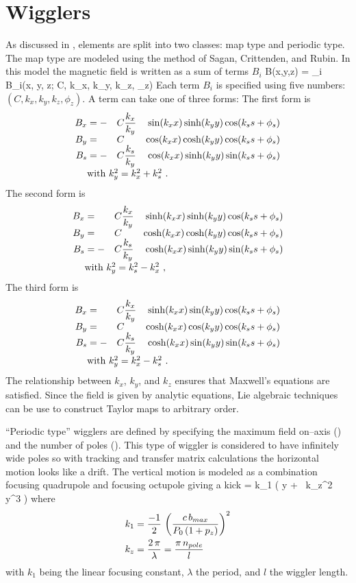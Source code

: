 \section{Wigglers}
\label{s:wiggler_phys}

As discussed in , \bmad {} elements are
split into two classes: map type and periodic type. The map type
 are modeled using the method of Sagan, Crittenden, and
Rubin\cite{b:wiggler}. In this model the magnetic field is written as
a sum of terms $B_i$
\Begineq
  B(x,y,z) = \sum_i B_i(x, y, z; C, k_x, k_y, k_z, \phi_z)
\Endeq 
Each term $B_i$ is specified using five numbers: 
$(C, k_x, k_y, k_z, \phi_z)$. A term can take one of three forms: The first
form is
\begin{alignat}{4}
  B_x &= -&C &\dfrac{k_x}{k_y} & \sin(\kxx) \sinh(\kyy) \cos(\ksss) \CRNEG
  B_y &=  &C &                 & \cos(\kxx) \cosh(\kyy) \cos(\ksss) \CRNEG
  B_s &= -&C &\dfrac{k_s}{k_y} & \cos(\kxx) \sinh(\kyy) \sin(\ksss) \CRneg
  & \makebox[1pt][l]{with $k_y^2 = k_x^2 + k_s^2$ .} &&&  \label{f1}
\end{alignat}
The second form is
\begin{alignat}{4}
  B_x &=  &C &\dfrac{k_x}{k_y} & \sinh(\kxx) \sinh(\kyy) \cos(\ksss) \CRNEG
  B_y &=  &C &                 & \cosh(\kxx) \cosh(\kyy) \cos(\ksss) \CRNEG
  B_s &= -&C &\dfrac{k_s}{k_y} & \cosh(\kxx) \sinh(\kyy) \sin(\ksss) \CRneg
  & \makebox[1pt][l]{with $k_y^2 = k_s^2 - k_x^2$ ,} &&&  \label{f2}
\end{alignat}
The third form is
\begin{alignat}{4}
  B_x &=  &C &\dfrac{k_x}{k_y} & \sinh(\kxx) \sin(\kyy) \cos(\ksss) \CRNEG
  B_y &=  &C &                 & \cosh(\kxx) \cos(\kyy) \cos(\ksss) \CRNEG
  B_s &= -&C &\dfrac{k_s}{k_y} & \cosh(\kxx) \sin(\kyy) \sin(\ksss) \CRneg
  & \makebox[1pt][l]{with $k_y^2 = k_x^2 - k_s^2$ .} &&& \label{f3}
\end{alignat}
The relationship between $k_x$, $k_y$, and $k_z$ ensures that
Maxwell's equations are satisfied. Since the field is given by
analytic equations, Lie algebraic techniques can be use to construct
Taylor maps to arbitrary order.

``Periodic type'' wigglers are defined by specifying the maximum field
on--axis () and the number of poles (). This type
of wiggler is considered to have infinitely wide poles so with
 tracking and transfer matrix calculations the
horizontal motion looks like a drift. The vertical motion is modeled
as a combination focusing quadrupole and focusing octupole
giving a kick\cite{b:corbett}
\Begineq
   = k_1 \left( y +  \, k_z^2 \, y^3 \right)
\Endeq
where
\begin{alignat}{1}
  k_1 &= \frac{-1}{2} \, \left( \frac{c \, b_{max}}{P_0 \, (1 + p_z)} \right)^2 \nonumber \\
  k_z &= \frac{2 \, \pi}{\lambda} = \frac{\pi \, n_{pole}}{l}
   \nonumber
\end{alignat}
with $k_1$ being the linear focusing constant, $\lambda$ the period,
and $l$ the wiggler length.

